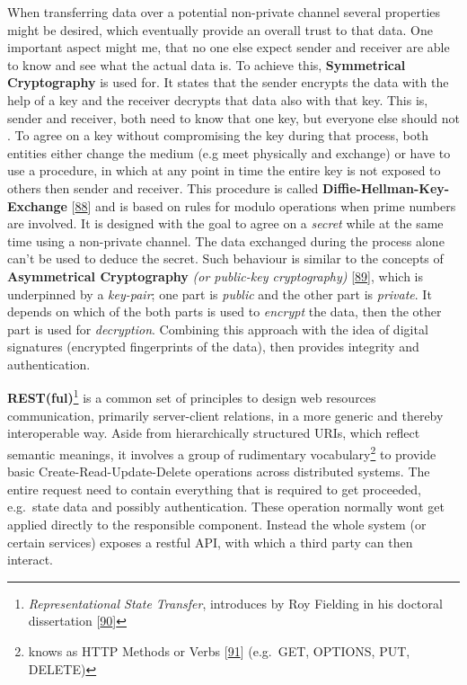 \documentclass[12pt,english,a4paper,titlepage,cleardoublepage=empty,dottedtoc]{report}
\begin{document}
When transferring data over a potential non-private channel several
properties might be desired, which eventually provide an overall trust
to that data. One important aspect might me, that no one else expect
sender and receiver are able to know and see what the actual data is. To
achieve this, \textbf{Symmetrical Cryptography} is used for. It states
that the sender encrypts the data with the help of a key and the
receiver decrypts that data also with that key. This is, sender and
receiver, both need to know that one key, but everyone else should not .
To agree on a key without compromising the key during that process, both
entities either change the medium (e.g meet physically and exchange) or
have to use a procedure, in which at any point in time the entire key is
not exposed to others then sender and receiver. This procedure is called
\textbf{Diffie-Hellman-Key-Exchange}
{[}\protect\hyperlink{ref-paper_1976_d-h-key-exchange}{88}{]} and is
based on rules for modulo operations when prime numbers are involved. It
is designed with the goal to agree on a \emph{secret} while at the same
time using a non-private channel. The data exchanged during the process
alone can't be used to deduce the secret. Such behaviour is similar to
the concepts of
\textbf{\protect\hypertarget{link_asym-crypto}{}{Asymmetrical
Cryptography}} \emph{(or public-key cryptography)}
{[}\protect\hyperlink{ref-book_2014_chapter-9-1-public-key-crypto}{89}{]},
which is underpinned by a \emph{key-pair}; one part is \emph{public} and
the other part is \emph{private}. It depends on which of the both parts
is used to \emph{encrypt} the data, then the other part is used for
\emph{decryption}. Combining this approach with the idea of digital
signatures (encrypted fingerprints of the data), then provides integrity
and authentication.

\textbf{REST(ful)}\footnote{\emph{Representational State Transfer},
  introduces by Roy Fielding in his doctoral dissertation
  {[}\protect\hyperlink{ref-web_spec_rest}{90}{]}} is a common set of
principles to design web resources communication, primarily
server-client relations, in a more generic and thereby interoperable
way. Aside from hierarchically structured URIs, which reflect semantic
meanings, it involves a group of rudimentary vocabulary\footnote{knows
  as HTTP Methods or Verbs
  {[}\protect\hyperlink{ref-web_spec_http-methods}{91}{]} (e.g.~GET,
  OPTIONS, PUT, DELETE)} to provide basic Create-Read-Update-Delete
operations across distributed systems. The entire request need to
contain everything that is required to get proceeded, e.g.~state data
and possibly authentication. These operation normally wont get applied
directly to the responsible component. Instead the whole system (or
certain services) exposes a restful API, with which a third party can
then interact.
\end{document}

